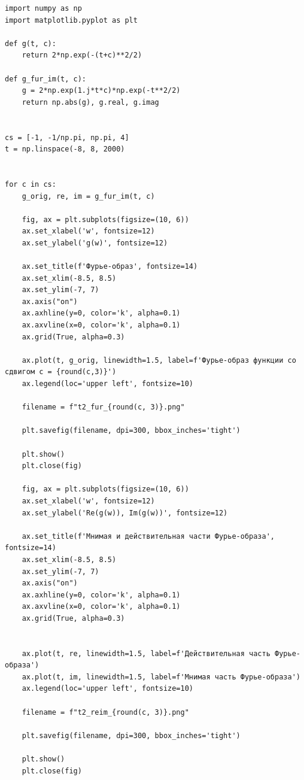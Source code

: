 \documentclass[a4paper, 12pt]{article}
\begin{document}
\begin{lstlisting}[caption={Код для построения Фурье-образа сдвинутой функции}]
import numpy as np
import matplotlib.pyplot as plt

def g(t, c):
    return 2*np.exp(-(t+c)**2/2)

def g_fur_im(t, c):
    g = 2*np.exp(1.j*t*c)*np.exp(-t**2/2)
    return np.abs(g), g.real, g.imag


cs = [-1, -1/np.pi, np.pi, 4]
t = np.linspace(-8, 8, 2000)


for c in cs:
    g_orig, re, im = g_fur_im(t, c)

    fig, ax = plt.subplots(figsize=(10, 6))
    ax.set_xlabel('w', fontsize=12)
    ax.set_ylabel('g(w)', fontsize=12)
    
    ax.set_title(f'Фурье-образ', fontsize=14)
    ax.set_xlim(-8.5, 8.5)
    ax.set_ylim(-7, 7)
    ax.axis("on")
    ax.axhline(y=0, color='k', alpha=0.1)
    ax.axvline(x=0, color='k', alpha=0.1) 
    ax.grid(True, alpha=0.3)
    
    ax.plot(t, g_orig, linewidth=1.5, label=f'Фурье-образ функции со сдвигом c = {round(c,3)}')
    ax.legend(loc='upper left', fontsize=10)

    filename = f"t2_fur_{round(c, 3)}.png"

    plt.savefig(filename, dpi=300, bbox_inches='tight')
    
    plt.show()
    plt.close(fig)

    fig, ax = plt.subplots(figsize=(10, 6))
    ax.set_xlabel('w', fontsize=12)
    ax.set_ylabel('Re(g(w)), Im(g(w))', fontsize=12)
    
    ax.set_title(f'Мнимая и действительная части Фурье-образа', fontsize=14)
    ax.set_xlim(-8.5, 8.5)
    ax.set_ylim(-7, 7)
    ax.axis("on")
    ax.axhline(y=0, color='k', alpha=0.1)
    ax.axvline(x=0, color='k', alpha=0.1) 
    ax.grid(True, alpha=0.3)
    
    
    ax.plot(t, re, linewidth=1.5, label=f'Действительная часть Фурье-образа')
    ax.plot(t, im, linewidth=1.5, label=f'Мнимая часть Фурье-образа')
    ax.legend(loc='upper left', fontsize=10)
    
    filename = f"t2_reim_{round(c, 3)}.png"

    plt.savefig(filename, dpi=300, bbox_inches='tight')
    
    plt.show()
    plt.close(fig)
\end{lstlisting}
\end{document}

